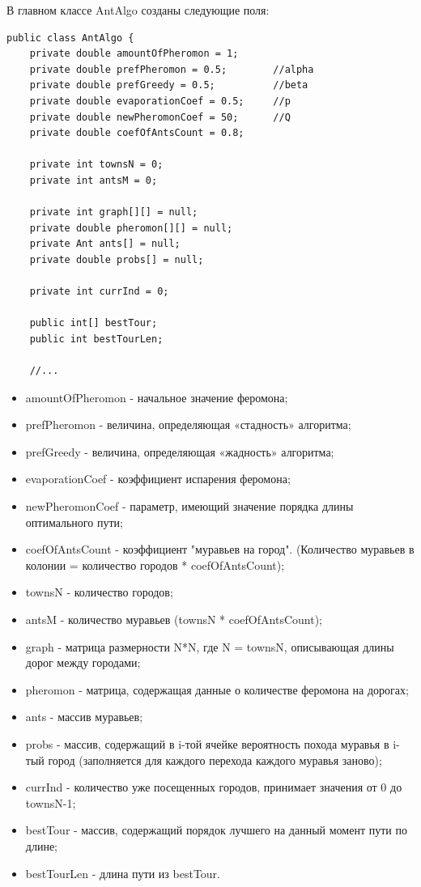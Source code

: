 \documentclass[a4paper,12pt]{article}
\begin{document}
В главном классе AntAlgo созданы следующие поля:
\begin{lstlisting}[label=some-code,caption=Поля класса AntAlgo]
public class AntAlgo {
    private double amountOfPheromon = 1;
    private double prefPheromon = 0.5;        //alpha
    private double prefGreedy = 0.5;          //beta
    private double evaporationCoef = 0.5;     //p
    private double newPheromonCoef = 50;      //Q
    private double coefOfAntsCount = 0.8;
    
    private int townsN = 0;
    private int antsM = 0;
    
    private int graph[][] = null;
    private double pheromon[][] = null;
    private Ant ants[] = null;
    private double probs[] = null;
    
    private int currInd = 0;
    
    public int[] bestTour;
    public int bestTourLen;
    
    //...

\end{lstlisting}
\begin{itemize}
    \item amountOfPheromon - начальное значение феромона;
    \item prefPheromon - величина, определяющая «стадность» алгоритма;
    \item prefGreedy  - величина, определяющая «жадность» алгоритма;
    \item evaporationCoef - коэффициент испарения феромона;
    \item newPheromonCoef - параметр, имеющий значение порядка длины оптимального пути;
    \item coefOfAntsCount - коэффициент "муравьев на город". (Количество муравьев в колонии = количество городов * coefOfAntsCount);
    \item townsN - количество городов;
    \item antsM - количество муравьев (townsN * coefOfAntsCount);
    \item graph - матрица размерности N*N, где N = townsN, описывающая длины дорог между городами;
    \item pheromon - матрица, содержащая данные о количестве феромона на дорогах;
    \item ants - массив муравьев;
    \item probs - массив, содержащий в i-той ячейке вероятность похода муравья в i-тый город (заполняется для каждого перехода каждого муравья заново);
    \item currInd - количество уже посещенных городов, принимает значения от 0 до townsN-1;
    \item bestTour - массив, содержащий порядок лучшего на данный момент пути по длине;
    \item bestTourLen - длина пути из bestTour.
\end{itemize}
\end{document}
